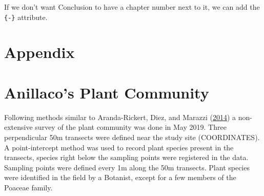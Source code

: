 \documentclass[msc,numbers,hidelinks]{coppe}
\begin{document}
  If we don't want Conclusion to have a chapter number next to it, we can add the \texttt{\{-\}} attribute.

  \appendix

  \appendix

  \hypertarget{appendix}{%
  \chapter*{Appendix}\label{appendix}}

  \hypertarget{anillacos-plant-community}{%
  \chapter{Anillaco's Plant Community}\label{anillacos-plant-community}}

  Following methods similar to Aranda-Rickert, Diez, and Marazzi (\protect\hyperlink{ref-aranda-rickertExtrafloralNectarFuels2014}{2014}) a non-extensive survey of the plant community was done in May 2019. Three perpendicular 50m transects were defined near the study site (COORDINATES). A point-intercept method was used to record plant species present in the transects, species right below the sampling points were registered in the data. Sampling points were defined every 1m along the 50m transects. Plant species were identified in the field by a Botanist, except for a few members of the Poaceae family.
\end{document}

